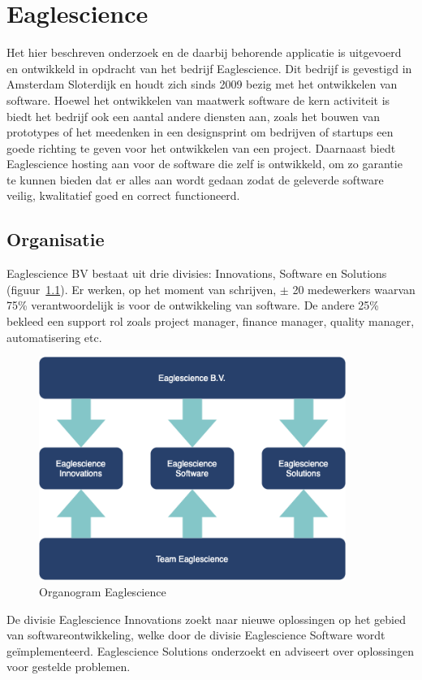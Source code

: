 \chapter{Eaglescience}\label{ch:Eaglescience} %

Het hier beschreven onderzoek en de daarbij behorende applicatie is uitgevoerd en ontwikkeld in opdracht van het bedrijf Eaglescience. Dit bedrijf is gevestigd in Amsterdam Sloterdijk en houdt zich sinds 2009 bezig met het ontwikkelen van software. Hoewel het ontwikkelen van maatwerk software de kern activiteit is biedt het bedrijf ook een aantal andere diensten aan, zoals het bouwen van prototypes of het meedenken in een designsprint om bedrijven of startups een goede richting te geven voor het ontwikkelen van een project. Daarnaast biedt Eaglescience hosting aan voor de software die zelf is ontwikkeld, om zo garantie te kunnen bieden dat er alles aan wordt gedaan zodat de geleverde software veilig, kwalitatief goed en correct functioneerd.

\section{Organisatie}\label{sec:organisatie}
Eaglescience BV bestaat uit drie divisies: Innovations, Software en Solutions (figuur~\ref{fig:Eaglescience organogram}). Er werken, op het moment van schrijven, $\pm$ 20 medewerkers waarvan 75\% verantwoordelijk is voor de ontwikkeling van software. De andere 25\% bekleed een support rol zoals project manager, finance manager, quality manager, automatisering etc.

\begin{figure}[bth]
\myfloatalign
\includegraphics[width=10cm]{gfx/organogram}
\caption{Organogram Eaglescience}
\label{fig:Eaglescience organogram}
\end{figure}
De divisie Eaglescience Innovations zoekt naar nieuwe oplossingen op het gebied van softwareontwikkeling, welke door de divisie Eaglescience Software wordt geïmplementeerd. Eaglescience Solutions onderzoekt en adviseert over oplossingen voor gestelde problemen.\\

